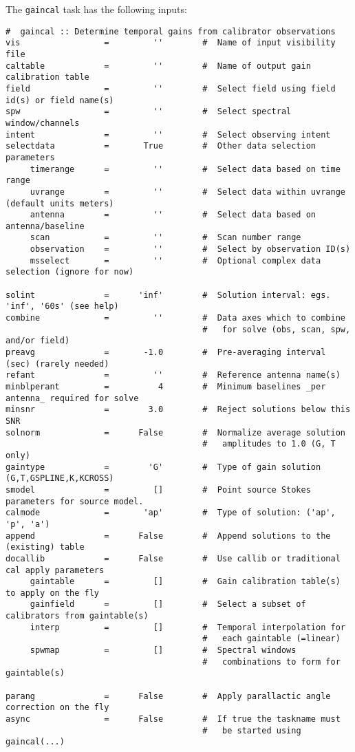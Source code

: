 The {\tt gaincal} task has the following inputs:
\small
\begin{verbatim}
#  gaincal :: Determine temporal gains from calibrator observations
vis                 =         ''        #  Name of input visibility file
caltable            =         ''        #  Name of output gain calibration table
field               =         ''        #  Select field using field id(s) or field name(s)
spw                 =         ''        #  Select spectral window/channels
intent              =         ''        #  Select observing intent
selectdata          =       True        #  Other data selection parameters
     timerange      =         ''        #  Select data based on time range
     uvrange        =         ''        #  Select data within uvrange (default units meters)
     antenna        =         ''        #  Select data based on antenna/baseline
     scan           =         ''        #  Scan number range
     observation    =         ''        #  Select by observation ID(s)
     msselect       =         ''        #  Optional complex data selection (ignore for now)

solint              =      'inf'        #  Solution interval: egs. 'inf', '60s' (see help)
combine             =         ''        #  Data axes which to combine
                                        #   for solve (obs, scan, spw, and/or field)
preavg              =       -1.0        #  Pre-averaging interval (sec) (rarely needed)
refant              =         ''        #  Reference antenna name(s)
minblperant         =          4        #  Minimum baselines _per antenna_ required for solve
minsnr              =        3.0        #  Reject solutions below this SNR
solnorm             =      False        #  Normalize average solution
                                        #   amplitudes to 1.0 (G, T only)
gaintype            =        'G'        #  Type of gain solution (G,T,GSPLINE,K,KCROSS)
smodel              =         []        #  Point source Stokes parameters for source model.
calmode             =       'ap'        #  Type of solution: ('ap', 'p', 'a')
append              =      False        #  Append solutions to the (existing) table
docallib            =      False        #  Use callib or traditional cal apply parameters
     gaintable      =         []        #  Gain calibration table(s) to apply on the fly
     gainfield      =         []        #  Select a subset of calibrators from gaintable(s)
     interp         =         []        #  Temporal interpolation for
                                        #   each gaintable (=linear)
     spwmap         =         []        #  Spectral windows
                                        #   combinations to form for gaintable(s)

parang              =      False        #  Apply parallactic angle correction on the fly
async               =      False        #  If true the taskname must
                                        #   be started using gaincal(...)
\end{verbatim}
